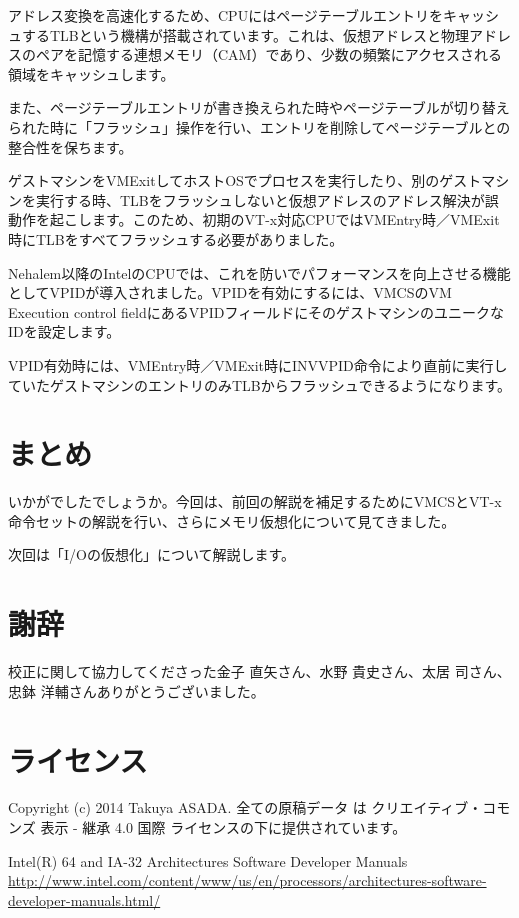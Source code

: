 アドレス変換を高速化するため、CPUにはページテーブルエントリをキャッシュするTLBという機構が搭載されています。これは、仮想アドレスと物理アドレスのペアを記憶する連想メモリ（CAM）であり、少数の頻繁にアクセスされる領域をキャッシュします。

また、ページテーブルエントリが書き換えられた時やページテーブルが切り替えられた時に「フラッシュ」操作を行い、エントリを削除してページテーブルとの整合性を保ちます。

ゲストマシンをVMExitしてホストOSでプロセスを実行したり、別のゲストマシンを実行する時、TLBをフラッシュしないと仮想アドレスのアドレス解決が誤動作を起こします。このため、初期のVT-x対応CPUではVMEntry時／VMExit時にTLBをすべてフラッシュする必要がありました。

Nehalem以降のIntelのCPUでは、これを防いでパフォーマンスを向上させる機能としてVPIDが導入されました。VPIDを有効にするには、VMCSのVM Execution control fieldにあるVPIDフィールドにそのゲストマシンのユニークなIDを設定します。

VPID有効時には、VMEntry時／VMExit時にINVVPID命令により直前に実行していたゲストマシンのエントリのみTLBからフラッシュできるようになります。

\section{まとめ}
いかがでしたでしょうか。今回は、前回の解説を補足するためにVMCSとVT-x命令セットの解説を行い、さらにメモリ仮想化について見てきました。

次回は「I/Oの仮想化」について解説します。

\section*{謝辞}
校正に関して協力してくださった金子 直矢さん、水野 貴史さん、太居 司さん、忠鉢 洋輔さんありがとうございました。

\section*{ライセンス}
Copyright (c) 2014 Takuya ASADA.
全ての原稿データ は クリエイティブ・コモンズ 表示 - 継承 4.0 国際 ライセンスの下に提供されています。

\begin{thebibliography}{4}
   Intel(R) 64 and IA-32 Architectures Software Developer Manuals \url{http://www.intel.com/content/www/us/en/processors/architectures-software-developer-manuals.html/}
\end{thebibliography}



